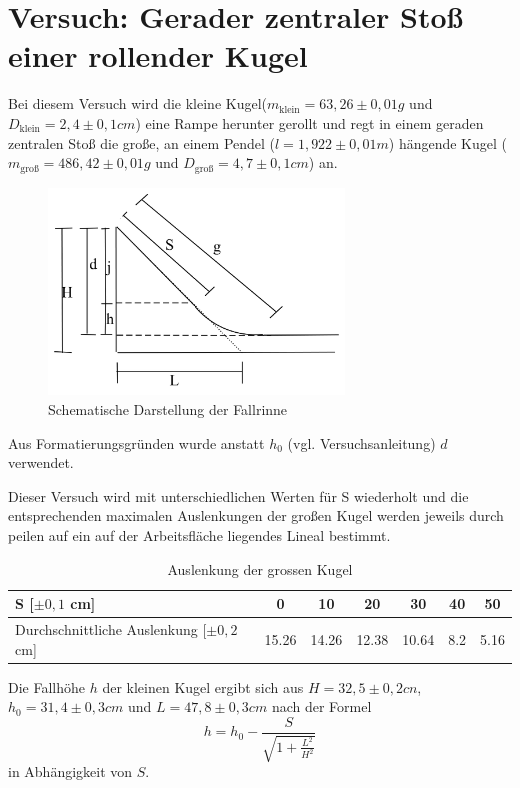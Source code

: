 \section{Versuch: Gerader zentraler Stoß einer rollender Kugel}
Bei diesem Versuch wird die kleine Kugel($m_{\text{klein}}= 63,26 \pm 0,01 g $ und $D_{\text{klein}}=2,4 \pm 0,1 cm$) eine Rampe herunter gerollt und regt in einem geraden zentralen Stoß die große, an einem Pendel ($l=1,922 \pm 0,01m$) hängende Kugel ($m_{\text{groß}}=486,42 \pm 0,01g$ und $D_{\text{groß}}=4,7 \pm 0,1 cm$) an.

\begin{figure}[htbp] 
  \centering
	\includegraphics[width=0.7\textwidth]{Fallrinne.png}
	\caption{Schematische Darstellung der Fallrinne}
  \label{fig:Fallrinne}
\end{figure}
Aus Formatierungsgründen wurde anstatt $h_0$ (vgl. Versuchsanleitung) $d$ verwendet.

Dieser Versuch wird mit unterschiedlichen Werten für S wiederholt und die entsprechenden maximalen Auslenkungen der großen Kugel werden jeweils durch peilen auf ein auf der Arbeitsfläche liegendes Lineal bestimmt.

\begin{table}[H]
  \centering
  \begin{tabular}{l | c | c | c | c | c | c}
    S [$\pm 0,1$ cm]  & \num{0} & \num{10} & \num{20} & \num{30} & \num{40} & \num{50}\\ \hline
   Durchschnittliche Auslenkung [$\pm 0,2$ cm] & \num{15,26} & \num{14,26} & \num{12,38} & \num{10,64} & \num{8,2} & \num{5,16} \\
    
  \end{tabular}
  \caption{Auslenkung der grossen Kugel}
  \label{tab:auslenkgross}
\end{table}

Die Fallhöhe $h$ der kleinen Kugel ergibt sich aus $H=32,5 \pm0,2 cn$, $h_0=31,4 \pm 0,3cm$ und $L= 47,8 \pm 0,3cm$ nach der Formel
\begin{equation}
\label{eq:h}
h=h_0-\frac{S}{\sqrt{1+\frac{L^2}{H^2}}}
\end{equation}
in Abhängigkeit von $S$.

